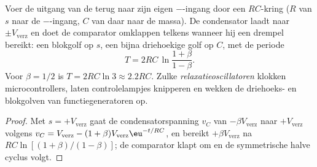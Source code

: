 \begin{proposition}\label{prop:b2:feedback-oscillators:astable}
Voer de uitgang van de  terug naar zijn eigen $-$-ingang
door een $RC$-kring ($R$ van $s$ naar de $-$-ingang, $C$ van daar naar de
massa). De condensator laadt naar $\pm V_{\text{verz}}$ en doet de comparator
omklappen telkens wanneer hij een drempel bereikt: een blokgolf op $s$, een
bijna driehoekige golf op $C$, met de periode
\[
T = 2RC\,\ln\frac{1 + \beta}{1 - \beta} .
\]
Voor $\beta = 1/2$ is $T = 2RC\ln3 \approx 2.2RC$. Zulke
\emph{relaxatieoscillatoren} klokken microcontrollers, laten controlelampjes
knipperen en wekken de driehoeks- en blokgolven van functiegeneratoren op.
\end{proposition}

\begin{proof}
Met $s = +V_{\text{verz}}$ gaat de condensatorspanning $v_C$ van
$-\beta V_{\text{verz}}$ naar $+V_{\text{verz}}$ volgens
$v_C = V_{\text{verz}} - (1 + \beta)
V_{\text{verz}}\eu^{-t/RC}$, en bereikt
$+\beta V_{\text{verz}}$ na $RC\ln[(1 + \beta)
/(1 - \beta)]$; de comparator
klapt om en de symmetrische halve cyclus volgt.
\end{proof}

